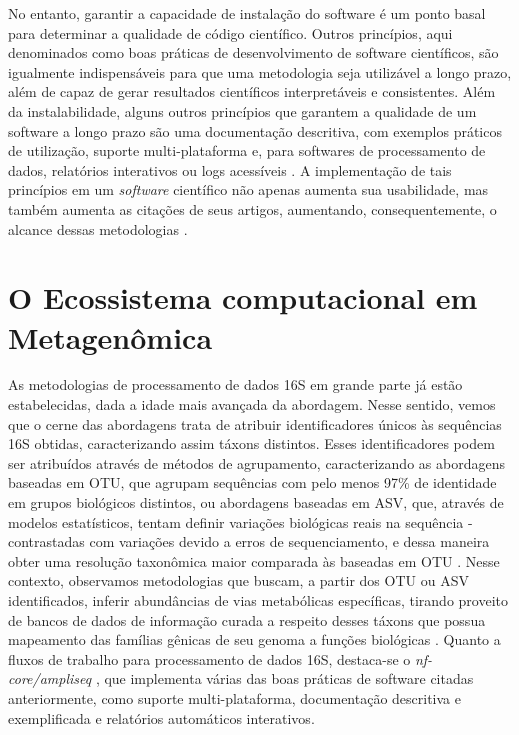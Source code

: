 \documentclass[
	12pt,				%
	oneside,			%
	a4paper,			%
	chapter=TITLE,		%
	section=TITLE,		%
	english,			%
	brazil				%
	]{abntex2}
\begin{document}
No entanto, garantir a capacidade de instalação do software é um ponto basal para determinar a qualidade de código científico. Outros princípios, aqui denominados como boas práticas de desenvolvimento de software científicos, são igualmente indispensáveis para que uma metodologia seja utilizável a longo prazo, além de capaz de gerar resultados científicos interpretáveis e consistentes. Além da instalabilidade, alguns outros princípios que garantem a qualidade de um software a longo prazo são uma documentação descritiva, com exemplos práticos de utilização, suporte multi-plataforma \autocite{mangul2019} e, para softwares de processamento de dados, relatórios interativos ou logs acessíveis \autocite{perkel2018}. A implementação de tais princípios em um \emph{software} científico não apenas aumenta sua usabilidade, mas também aumenta as citações de seus artigos, aumentando, consequentemente, o alcance dessas metodologias \autocite{mangul2019a}.

\section{O Ecossistema computacional em Metagenômica}\label{o-ecossistema-computacional-em-metagenuxf4mica}

As metodologias de processamento de dados \gls{16S} em grande parte já estão estabelecidas, dada a idade mais avançada da abordagem. Nesse sentido, vemos que o cerne das abordagens trata de atribuir identificadores únicos às sequências 16S obtidas, caracterizando assim táxons distintos. Esses identificadores podem ser atribuídos através de métodos de agrupamento, caracterizando as abordagens baseadas em \gls{OTU}, que agrupam sequências com pelo menos 97\% de identidade em grupos biológicos distintos, ou abordagens baseadas em \gls{ASV}, que, através de modelos estatísticos, tentam definir variações biológicas reais na sequência - contrastadas com variações devido a erros de sequenciamento, e dessa maneira obter uma resolução taxonômica maior comparada às baseadas em \gls{OTU} \autocite{chiarello2022}. Nesse contexto, observamos metodologias que buscam, a partir dos \gls{OTU} ou \gls{ASV} identificados, inferir abundâncias de vias metabólicas específicas, tirando proveito de bancos de dados de informação curada a respeito desses táxons que possua mapeamento das famílias gênicas de seu genoma a funções biológicas \autocite{douglas2020}. Quanto a fluxos de trabalho para processamento de dados \gls{16S}, destaca-se o \emph{nf-core/ampliseq} \autocite{straub2020}, que implementa várias das boas práticas de software citadas anteriormente, como suporte multi-plataforma, documentação descritiva e exemplificada e relatórios automáticos interativos.
\end{document}
